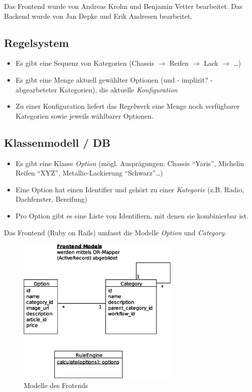 \documentclass[a4paper,10pt]{article}
\begin{document}
Das Frontend wurde von Andreas Krohn und Benjamin Vetter bearbeitet.
Das Backend wurde von Jan Depke und Erik Andresen bearbeitet.
 
\subsection*{Regelsystem}

\begin{itemize}
 \item Es gibt eine Sequenz von Kategorien (Chassis $\rightarrow$ Reifen $\rightarrow$ Lack $\rightarrow$ \ldots)
 \item Es gibt eine Menge aktuell gewählter Optionen (und - implizit? - abgearbeteter Kategorien), die aktuelle \emph{Konfiguration}
 \item Zu einer Konfiguration liefert das Regelwerk eine Menge noch verfügbarer Kategorien sowie jeweils wählbarer Optionen.
\end{itemize}

\subsection*{Klassenmodell / DB}

\begin{itemize}
 \item Es gibt eine Klasse \emph{Option} (mögl. Ausprägungen: Chassis "`Yaris"', Michelin Reifen "`XYZ"', Metallic-Lackierung "`Schwarz"'\ldots)
 \item Eine Option hat einen Identifier und gehört zu einer \emph{Kategorie} (z.B. Radio, Dachfenster, Bereifung)
 \item Pro Option gibt es eine Liste von Identifiern, mit denen sie kombinierbar ist.
\end{itemize}

Das Frontend (Ruby on Rails) umfasst die Modelle \textit{Option} und \textit{Category}.

\begin{center}
  \begin{figure}[t]
    \includegraphics[width=0.7\textwidth]{frontend_models.eps}
    \caption{Modelle des Frotends}
    \label{frontend_models}
  \end{figure}
\end{center}
\end{document}
